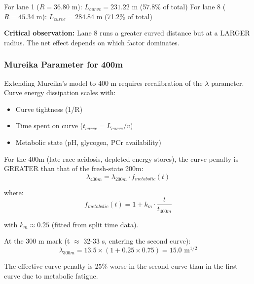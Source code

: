 For lane 1 ($R = 36.80$ m): $L_{curve} = 231.22$ m (57.8\% of total)
For lane 8 ($R = 45.34$ m): $L_{curve} = 284.84$ m (71.2\% of total)

\textbf{Critical observation:} Lane 8 runs a greater curved distance but at a LARGER radius. The net effect depends on which factor dominates.

\subsubsection{Mureika Parameter for 400m}

Extending Mureika's model to 400 m requires recalibration of the $\lambda$ parameter. Curve energy dissipation scales with:
\begin{itemize}
    \item Curve tightness (1/R)
    \item Time spent on curve ($t_{curve} = L_{curve}/v$)
    \item Metabolic state (pH, glycogen, PCr availability)
\end{itemize}

For the 400m (late-race acidosis, depleted energy stores), the curve penalty is GREATER than that of the fresh-state 200m:
\begin{equation}
\lambda_{400m} = \lambda_{200m} \cdot f_{metabolic}(t)
\end{equation}

where:
\begin{equation}
f_{metabolic}(t) = 1 + k_m \cdot \frac{t}{t_{400m}}
\end{equation}

with $k_m \approx 0.25$ (fitted from split time data).

At the 300 m mark (t $\approx$ 32-33 s, entering the second curve):
\begin{equation}
\lambda_{300m} = 13.5 \times (1 + 0.25 \times 0.75) = 15.0 \text{ m}^{1/2}
\end{equation}

The effective curve penalty is 25\% worse in the second curve than in the first curve due to metabolic fatigue.

